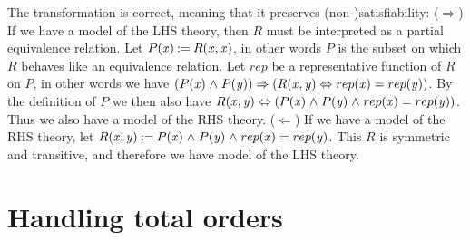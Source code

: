 \documentclass{article}
\newcommand{\Varid}[1]{\mathit{#1}}
\begin{document}
The transformation is correct, meaning that it preserves (non-)satisfiability: ($\Rightarrow$) If we have a model of the LHS theory, then \ensuremath{R} must be interpreted as a partial equivalence relation. Let \ensuremath{P\hspace{-0.1cm}\;(\Varid{x})\mathbin{:=}R\hspace{-0.1cm}\;(\Varid{x},\Varid{x})}, in other words \ensuremath{P} is the subset on which \ensuremath{R} behaves like an equivalence relation. Let \ensuremath{rep} be a representative function of \ensuremath{R} on \ensuremath{P}, in other words we have \ensuremath{(P\hspace{-0.1cm}\;(\Varid{x})\mathrel{\wedge}P\hspace{-0.1cm}\;(\Varid{y}))\Rightarrow (R\hspace{-0.1cm}\;(\Varid{x},\Varid{y})\Leftrightarrow rep\hspace{-0.1cm}\;(\Varid{x})\mathrel{=}rep\hspace{-0.1cm}\;(\Varid{y}))}. By the definition of \ensuremath{P} we then also have \ensuremath{R\hspace{-0.1cm}\;(\Varid{x},\Varid{y})\Leftrightarrow (P\hspace{-0.1cm}\;(\Varid{x})\mathrel{\wedge}P\hspace{-0.1cm}\;(\Varid{y})\mathrel{\wedge}rep\hspace{-0.1cm}\;(\Varid{x})\mathrel{=}rep\hspace{-0.1cm}\;(\Varid{y}))}. Thus we also have a model of the RHS theory. ($\Leftarrow$) If we have a model of the RHS theory, let \ensuremath{R\hspace{-0.1cm}\;(\Varid{x},\Varid{y})\mathbin{:=}P\hspace{-0.1cm}\;(\Varid{x})\mathrel{\wedge}P\hspace{-0.1cm}\;(\Varid{y})\mathrel{\wedge}rep\hspace{-0.1cm}\;(\Varid{x})\mathrel{=}rep\hspace{-0.1cm}\;(\Varid{y})}. This \ensuremath{R} is symmetric and transitive, and therefore we have model of the LHS theory.


\section{Handling total orders}
\end{document}
